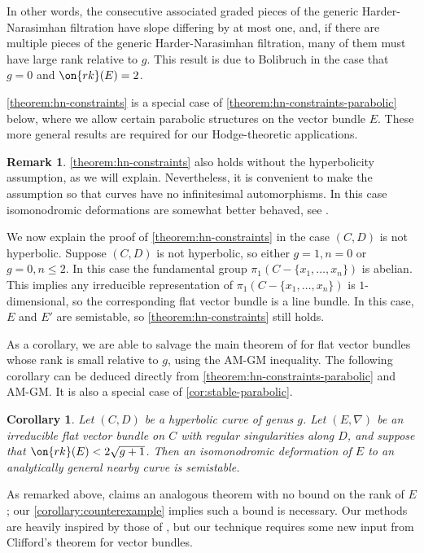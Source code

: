 \documentclass[12 pt]{amsart}
\theoremstyle{plain}
\newtheorem{corollary}[subsubsection]{Corollary}
\theoremstyle{definition}
\newtheorem{remark}[subsubsection]{Remark}
\theoremstyle{remark}
\numberwithin{equation}{section}
\begin{document}
In other words, the consecutive associated graded pieces of the generic
Harder-Narasimhan filtration have slope differing by at most one, and, if there
are multiple pieces of the generic Harder-Narasimhan filtration, many of them must have large rank relative to $g$.  This result is due to Bolibruch \cite[Proposition 5.6]{bolibrukh1990riemann} in the case that $g=0$ and $\on{rk}(E)=2$.

\autoref{theorem:hn-constraints} is a special case of
\autoref{theorem:hn-constraints-parabolic} below, where we allow certain
parabolic structures on the vector bundle $E$. These more general results are required for our Hodge-theoretic applications.
\begin{remark}
	\label{remark:}
	\autoref{theorem:hn-constraints} also holds without the hyperbolicity
	assumption, as we will explain. Nevertheless, it is convenient to make the assumption 
	so that curves have no infinitesimal automorphisms. In this case
	isomonodromic deformations are somewhat better behaved, see 
	\cite[p. 518]{Heu:universal-isomonodromic}.

	We now explain the proof of \autoref{theorem:hn-constraints} in the case
	$(C, D)$ is not hyperbolic.
	Suppose $(C, D)$ is not hyperbolic, so either $g = 1, n = 0$ or $g = 0, n \leq 2$. In
this case the fundamental group $\pi_1(C - \{x_1, \ldots, x_n\})$ is abelian.
This implies any irreducible representation of $\pi_1(C - \{x_1, \ldots, x_n\})$
is $1$-dimensional, so the corresponding flat vector bundle is a line bundle. In
this case, $E$ and $E'$ are semistable, so
\autoref{theorem:hn-constraints} still holds.
\end{remark}


As a corollary, we are able to salvage the main theorem of \cite{BHH:logarithmic} for flat vector bundles whose rank is small relative to $g$, using the AM-GM inequality.
The following corollary can be deduced directly from
\autoref{theorem:hn-constraints-parabolic} and AM-GM. 
It is also a special
case of \autoref{cor:stable-parabolic}.
\begin{corollary}\label{cor:stable}
	Let $(C, D)$ be a hyperbolic curve of genus $g$.
Let $({E}, \nabla)$ be an irreducible flat
vector bundle on $C$ with regular singularities along $D$, and suppose that
$\on{rk}(E)<2\sqrt{g+1}$. 
Then an isomonodromic deformation of 
$E$
to an analytically general nearby curve is  semistable. 
\end{corollary}
 As remarked above, \cite{BHH:logarithmic} claims an analogous theorem with no bound on the rank of $E$; our \autoref{corollary:counterexample} implies such a bound is necessary. Our methods are heavily inspired by those of \cite{BHH:logarithmic}, but our
technique requires some new input from Clifford's theorem for vector bundles.
\end{document}
